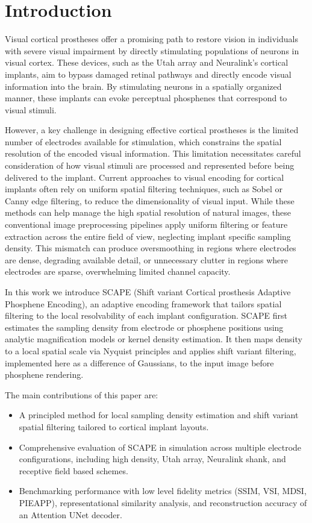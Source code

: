 \section{Introduction}
Visual cortical prostheses offer a promising path to restore vision in individuals with severe visual impairment by directly stimulating populations of neurons in visual cortex. These devices, such as the Utah array and Neuralink's cortical implants, aim to bypass damaged retinal pathways and directly encode visual information into the brain. By stimulating neurons in a spatially organized manner, these implants can evoke perceptual phosphenes that correspond to visual stimuli.

However, a key challenge in designing effective cortical prostheses is the limited number of electrodes available for stimulation, which constrains the spatial resolution of the encoded visual information. This limitation necessitates careful consideration of how visual stimuli are processed and represented before being delivered to the implant.
Current approaches to visual encoding for cortical implants often rely on uniform spatial filtering techniques, such as Sobel or Canny edge filtering, to reduce the dimensionality of visual input. While these methods can help manage the high spatial resolution of natural images, these conventional image preprocessing pipelines apply uniform filtering or feature extraction across the entire field of view, neglecting implant specific sampling density. This mismatch can produce oversmoothing in regions where electrodes are dense, degrading available detail, or unnecessary clutter in regions where electrodes are sparse, overwhelming limited channel capacity.

In this work we introduce SCAPE (Shift variant Cortical prosthesis Adaptive Phosphene Encoding), an adaptive encoding framework that tailors spatial filtering to the local resolvability of each implant configuration. SCAPE first estimates the sampling density from electrode or phosphene positions using analytic magnification models or kernel density estimation. It then maps density to a local spatial scale via Nyquist principles and applies shift variant filtering, implemented here as a difference of Gaussians, to the input image before phosphene rendering. 

The main contributions of this paper are:
\begin{itemize}
  \item A principled method for local sampling density estimation and shift variant spatial filtering tailored to cortical implant layouts.
  \item Comprehensive evaluation of SCAPE in simulation across multiple electrode configurations, including high density, Utah array, Neuralink shank, and receptive field based schemes.
  \item Benchmarking performance with low level fidelity metrics (SSIM, VSI, MDSI, PIEAPP), representational similarity analysis, and reconstruction accuracy of an Attention UNet decoder.
\end{itemize}
